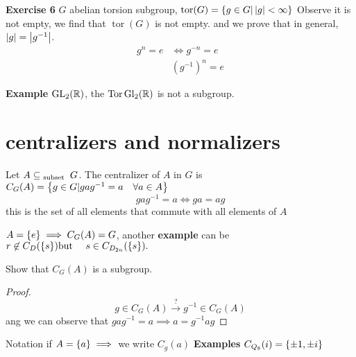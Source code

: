 \textbf{Exercise 6} $G$ abelian torsion subgroup, $ \operatorname{tor}(G) = \left\lbrace g \in G| \left| g \right| < \infty \right\rbrace $  Observe it is not empty, we find that $ \operatorname{tor}(G) $ is not empty. and we prove that in general, $ \left| g \right| = \left| g^{-1} \right| $. 
\begin{align*}
g^n = e &\iff g^{-n}  = e \\
& (g^{-1})^n = e
\end{align*}


\textbf{Example} $ \operatorname{GL}_2 ( \mathbb{R} ) $, the $ \operatorname{Tor}\operatorname{Gl}_2 (\mathbb{R}) $ is not a subgroup.

\section*{centralizers and normalizers}
\begin{define}
	Let $ A \subseteq_{\textrm{ subset }}  G$. The centralizer of $A$ in $G$ is $ C_{G}(A) = \left\lbrace g \in G | gag^{-1} = a \quad \forall a \in A  \right\rbrace $
	\[ gag^{-1} = a \iff ga=ag \]
	this is the set of all elements that commute with all elements of $A$ 
\end{define}
\begin{example}
	$A = \left\lbrace e \right\rbrace \implies C_{G}(A) =G $, another \textbf{example }  can be $ r \not\in C_D(\left\lbrace s \right\rbrace) \textrm{but  }\quad s \in C_{D_{2n}} (\left\lbrace s \right\rbrace).$
\end{example}
Show that $ C_{G} (A) $ is a subgroup.
\begin{proof}
	\[ g \in C_G (A) \overset{?}{\rightarrow} g^{-1} \in C_G(A) \] 
	ang we can observe that $ gag^{-1} = a \implies a = g^{-1}ag $
\end{proof}
Notation if $ A = \left\lbrace a \right\rbrace \implies $ we write $C_g(a)$
\textbf{Examples} $C_{Q_8}(i) = \left\lbrace \pm 1, \pm i \right\rbrace $
